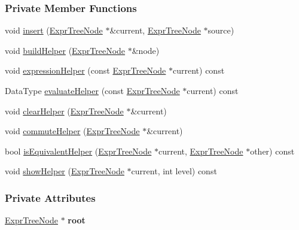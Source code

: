 \subsubsection*{Private Member Functions}
\begin{DoxyCompactItemize}
\item 
void \hyperlink{class_expr_tree_ac34ce3b5c63b2094d66d4387f711a852}{insert} (\hyperlink{class_expr_tree_1_1_expr_tree_node}{Expr\+Tree\+Node} $\ast$\&current, \hyperlink{class_expr_tree_1_1_expr_tree_node}{Expr\+Tree\+Node} $\ast$source)
\item 
void \hyperlink{class_expr_tree_afd8b4649b3a71b725c242dcec514b774}{build\+Helper} (\hyperlink{class_expr_tree_1_1_expr_tree_node}{Expr\+Tree\+Node} $\ast$\&node)
\item 
void \hyperlink{class_expr_tree_af44ca51709f3691e1b2906ffeb3a4c14}{expression\+Helper} (const \hyperlink{class_expr_tree_1_1_expr_tree_node}{Expr\+Tree\+Node} $\ast$current) const 
\item 
Data\+Type \hyperlink{class_expr_tree_ae62e9cbcdc0d64772271595e457e4a6e}{evaluate\+Helper} (const \hyperlink{class_expr_tree_1_1_expr_tree_node}{Expr\+Tree\+Node} $\ast$current) const 
\item 
void \hyperlink{class_expr_tree_a00a0f8c3f062b6cacae2a81ce5245539}{clear\+Helper} (\hyperlink{class_expr_tree_1_1_expr_tree_node}{Expr\+Tree\+Node} $\ast$\&current)
\item 
void \hyperlink{class_expr_tree_aaff3f1682720c5285d7ee9277002596c}{commute\+Helper} (\hyperlink{class_expr_tree_1_1_expr_tree_node}{Expr\+Tree\+Node} $\ast$\&current)
\item 
bool \hyperlink{class_expr_tree_a6c35a0a2ad1ca4b9ba507cb09b5b0d05}{is\+Equivalent\+Helper} (\hyperlink{class_expr_tree_1_1_expr_tree_node}{Expr\+Tree\+Node} $\ast$current, \hyperlink{class_expr_tree_1_1_expr_tree_node}{Expr\+Tree\+Node} $\ast$other) const 
\item 
void \hyperlink{class_expr_tree_a4a1342f4e255e1cc89bca07da2bc84cf}{show\+Helper} (\hyperlink{class_expr_tree_1_1_expr_tree_node}{Expr\+Tree\+Node} $\ast$current, int level) const 
\end{DoxyCompactItemize}
\subsubsection*{Private Attributes}
\begin{DoxyCompactItemize}
\item 
\hyperlink{class_expr_tree_1_1_expr_tree_node}{Expr\+Tree\+Node} $\ast$ {\bfseries root}\hypertarget{class_expr_tree_aad96de2c7df7ed8f49a87c7aa1b61e8f}{}\label{class_expr_tree_aad96de2c7df7ed8f49a87c7aa1b61e8f}

\end{DoxyCompactItemize}


